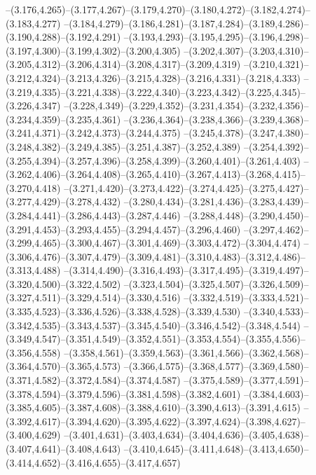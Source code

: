   --(3.176,4.265)--(3.177,4.267)--(3.179,4.270)--(3.180,4.272)--(3.182,4.274)--(3.183,4.277)%
  --(3.184,4.279)--(3.186,4.281)--(3.187,4.284)--(3.189,4.286)--(3.190,4.288)--(3.192,4.291)%
  --(3.193,4.293)--(3.195,4.295)--(3.196,4.298)--(3.197,4.300)--(3.199,4.302)--(3.200,4.305)%
  --(3.202,4.307)--(3.203,4.310)--(3.205,4.312)--(3.206,4.314)--(3.208,4.317)--(3.209,4.319)%
  --(3.210,4.321)--(3.212,4.324)--(3.213,4.326)--(3.215,4.328)--(3.216,4.331)--(3.218,4.333)%
  --(3.219,4.335)--(3.221,4.338)--(3.222,4.340)--(3.223,4.342)--(3.225,4.345)--(3.226,4.347)%
  --(3.228,4.349)--(3.229,4.352)--(3.231,4.354)--(3.232,4.356)--(3.234,4.359)--(3.235,4.361)%
  --(3.236,4.364)--(3.238,4.366)--(3.239,4.368)--(3.241,4.371)--(3.242,4.373)--(3.244,4.375)%
  --(3.245,4.378)--(3.247,4.380)--(3.248,4.382)--(3.249,4.385)--(3.251,4.387)--(3.252,4.389)%
  --(3.254,4.392)--(3.255,4.394)--(3.257,4.396)--(3.258,4.399)--(3.260,4.401)--(3.261,4.403)%
  --(3.262,4.406)--(3.264,4.408)--(3.265,4.410)--(3.267,4.413)--(3.268,4.415)--(3.270,4.418)%
  --(3.271,4.420)--(3.273,4.422)--(3.274,4.425)--(3.275,4.427)--(3.277,4.429)--(3.278,4.432)%
  --(3.280,4.434)--(3.281,4.436)--(3.283,4.439)--(3.284,4.441)--(3.286,4.443)--(3.287,4.446)%
  --(3.288,4.448)--(3.290,4.450)--(3.291,4.453)--(3.293,4.455)--(3.294,4.457)--(3.296,4.460)%
  --(3.297,4.462)--(3.299,4.465)--(3.300,4.467)--(3.301,4.469)--(3.303,4.472)--(3.304,4.474)%
  --(3.306,4.476)--(3.307,4.479)--(3.309,4.481)--(3.310,4.483)--(3.312,4.486)--(3.313,4.488)%
  --(3.314,4.490)--(3.316,4.493)--(3.317,4.495)--(3.319,4.497)--(3.320,4.500)--(3.322,4.502)%
  --(3.323,4.504)--(3.325,4.507)--(3.326,4.509)--(3.327,4.511)--(3.329,4.514)--(3.330,4.516)%
  --(3.332,4.519)--(3.333,4.521)--(3.335,4.523)--(3.336,4.526)--(3.338,4.528)--(3.339,4.530)%
  --(3.340,4.533)--(3.342,4.535)--(3.343,4.537)--(3.345,4.540)--(3.346,4.542)--(3.348,4.544)%
  --(3.349,4.547)--(3.351,4.549)--(3.352,4.551)--(3.353,4.554)--(3.355,4.556)--(3.356,4.558)%
  --(3.358,4.561)--(3.359,4.563)--(3.361,4.566)--(3.362,4.568)--(3.364,4.570)--(3.365,4.573)%
  --(3.366,4.575)--(3.368,4.577)--(3.369,4.580)--(3.371,4.582)--(3.372,4.584)--(3.374,4.587)%
  --(3.375,4.589)--(3.377,4.591)--(3.378,4.594)--(3.379,4.596)--(3.381,4.598)--(3.382,4.601)%
  --(3.384,4.603)--(3.385,4.605)--(3.387,4.608)--(3.388,4.610)--(3.390,4.613)--(3.391,4.615)%
  --(3.392,4.617)--(3.394,4.620)--(3.395,4.622)--(3.397,4.624)--(3.398,4.627)--(3.400,4.629)%
  --(3.401,4.631)--(3.403,4.634)--(3.404,4.636)--(3.405,4.638)--(3.407,4.641)--(3.408,4.643)%
  --(3.410,4.645)--(3.411,4.648)--(3.413,4.650)--(3.414,4.652)--(3.416,4.655)--(3.417,4.657)%

